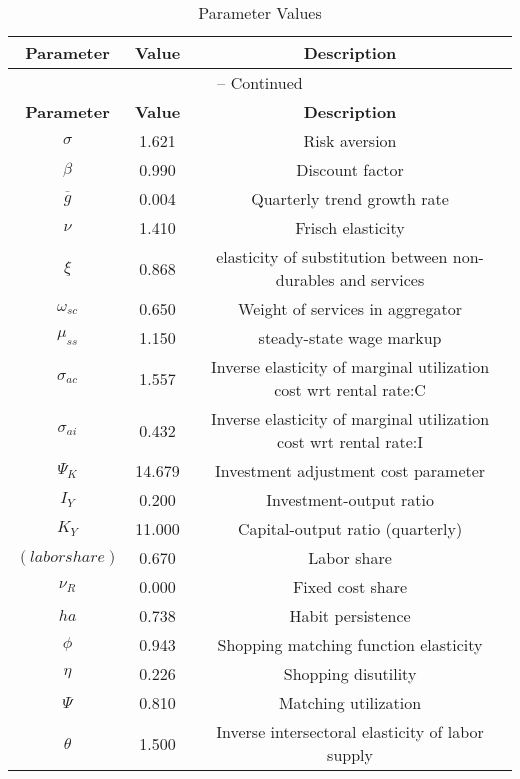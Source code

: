 \begin{center}
\begin{longtable}{ccc}
\caption{Parameter Values}\\%
\toprule%
\multicolumn{1}{c}{\textbf{Parameter}} &
\multicolumn{1}{c}{\textbf{Value}} &
 \multicolumn{1}{c}{\textbf{Description}}\\%
\midrule%
\endfirsthead
\multicolumn{3}{c}{{\tablename} \thetable{} -- Continued}\\%
\midrule%
\multicolumn{1}{c}{\textbf{Parameter}} &
\multicolumn{1}{c}{\textbf{Value}} &
  \multicolumn{1}{c}{\textbf{Description}}\\%
\midrule%
\endhead
${\sigma}$ 	 & 	 1.621 	 & 	 Risk aversion\\
${\beta}$ 	 & 	 0.990 	 & 	 Discount factor\\
${\overline{g}}$ 	 & 	 0.004 	 & 	 Quarterly trend growth rate\\
$\nu$ 	 & 	 1.410 	 & 	 Frisch elasticity\\
$\xi$ 	 & 	 0.868 	 & 	 elasticity of substitution between non-durables and services\\
$\omega_{sc}$ 	 & 	 0.650 	 & 	 Weight of services in aggregator\\
$\mu_{ss}$ 	 & 	 1.150 	 & 	 steady-state wage markup\\
${\sigma_{ac}}$ 	 & 	 1.557 	 & 	 Inverse elasticity of marginal utilization cost wrt rental rate:C\\
${\sigma_{ai}}$ 	 & 	 0.432 	 & 	 Inverse elasticity of marginal utilization cost wrt rental rate:I\\
${\Psi_{K}}$ 	 & 	 14.679 	 & 	 Investment adjustment cost parameter\\
${I_Y}$ 	 & 	 0.200 	 & 	 Investment-output ratio\\
${K_Y}$ 	 & 	 11.000 	 & 	 Capital-output ratio (quarterly)\\
$(labor share)$ 	 & 	 0.670 	 & 	 Labor share\\
${\nu_R}$ 	 & 	 0.000 	 & 	 Fixed cost share\\
${ha}$ 	 & 	 0.738 	 & 	 Habit persistence\\
${\phi}$ 	 & 	 0.943 	 & 	 Shopping matching function elasticity\\
${\eta}$ 	 & 	 0.226 	 & 	 Shopping disutility\\
${\Psi}$ 	 & 	 0.810 	 & 	 Matching utilization\\
${\theta}$ 	 & 	 1.500 	 & 	 Inverse intersectoral elasticity of labor supply\\

\end{longtable}
\end{center}
